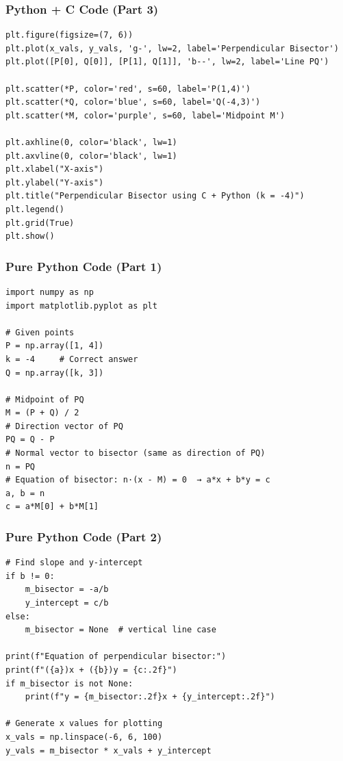 \documentclass{beamer}
\begin{document}
\begin{frame}[fragile]
\frametitle{Python + C Code (Part 3)}
\begin{lstlisting}
plt.figure(figsize=(7, 6))
plt.plot(x_vals, y_vals, 'g-', lw=2, label='Perpendicular Bisector')
plt.plot([P[0], Q[0]], [P[1], Q[1]], 'b--', lw=2, label='Line PQ')

plt.scatter(*P, color='red', s=60, label='P(1,4)')
plt.scatter(*Q, color='blue', s=60, label='Q(-4,3)')
plt.scatter(*M, color='purple', s=60, label='Midpoint M')

plt.axhline(0, color='black', lw=1)
plt.axvline(0, color='black', lw=1)
plt.xlabel("X-axis")
plt.ylabel("Y-axis")
plt.title("Perpendicular Bisector using C + Python (k = -4)")
plt.legend()
plt.grid(True)
plt.show()
\end{lstlisting}
\end{frame}
\begin{frame}[fragile]
\frametitle{Pure Python Code (Part 1)}
\begin{lstlisting}
import numpy as np
import matplotlib.pyplot as plt

# Given points
P = np.array([1, 4])
k = -4     # Correct answer
Q = np.array([k, 3])

# Midpoint of PQ
M = (P + Q) / 2
# Direction vector of PQ
PQ = Q - P
# Normal vector to bisector (same as direction of PQ)
n = PQ
# Equation of bisector: n·(x - M) = 0  → a*x + b*y = c
a, b = n
c = a*M[0] + b*M[1]
\end{lstlisting}
\end{frame}

\begin{frame}[fragile]
\frametitle{Pure Python Code (Part 2)}
\begin{lstlisting}
# Find slope and y-intercept
if b != 0:
    m_bisector = -a/b
    y_intercept = c/b
else:
    m_bisector = None  # vertical line case

print(f"Equation of perpendicular bisector:")
print(f"({a})x + ({b})y = {c:.2f}")
if m_bisector is not None:
    print(f"y = {m_bisector:.2f}x + {y_intercept:.2f}")

# Generate x values for plotting
x_vals = np.linspace(-6, 6, 100)
y_vals = m_bisector * x_vals + y_intercept
\end{lstlisting}
\end{frame}
\end{document}
